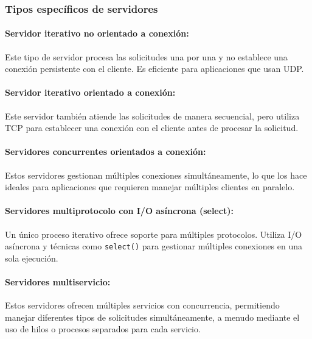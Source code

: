 \documentclass[a4paper,12pt]{article}
\begin{document}
\subsubsection{Tipos específicos de servidores}

\paragraph{Servidor iterativo no orientado a conexión:} 
Este tipo de servidor procesa las solicitudes una por una y no establece una conexión persistente con el cliente. Es eficiente para aplicaciones que usan UDP.

\paragraph{Servidor iterativo orientado a conexión:} 
Este servidor también atiende las solicitudes de manera secuencial, pero utiliza TCP para establecer una conexión con el cliente antes de procesar la solicitud.

\paragraph{Servidores concurrentes orientados a conexión:} 
Estos servidores gestionan múltiples conexiones simultáneamente, lo que los hace ideales para aplicaciones que requieren manejar múltiples clientes en paralelo.

\paragraph{Servidores multiprotocolo con I/O asíncrona (select):} 
Un único proceso iterativo ofrece soporte para múltiples protocolos. Utiliza I/O asíncrona y técnicas como \texttt{select()} para gestionar múltiples conexiones en una sola ejecución.

\paragraph{Servidores multiservicio:} 
Estos servidores ofrecen múltiples servicios con concurrencia, permitiendo manejar diferentes tipos de solicitudes simultáneamente, a menudo mediante el uso de hilos o procesos separados para cada servicio.


\end{document}
